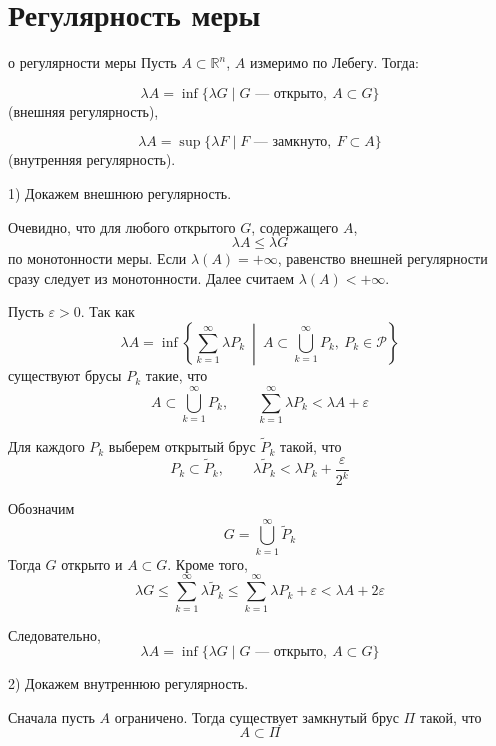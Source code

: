 \documentclass[12pt,a4paper]{article}
\begin{document}
\newpage

\section{Регулярность меры}

\begin{theorem}{о регулярности меры}
    Пусть $A \subset \mathbb{R}^n$, $A$ измеримо по Лебегу. Тогда:

    \[
        \lambda A = \inf\{\lambda G \mid G \text{ --- открыто},\ A \subset G\}
    \]
    (внешняя регулярность),

    \[
        \lambda A = \sup\{\lambda F \mid F \text{ --- замкнуто},\ F \subset A\}
    \]
    (внутренняя регулярность).
\end{theorem}

\begin{proofbox}{}
    1) Докажем внешнюю регулярность.

    Очевидно, что для любого открытого $G$, содержащего $A$,
    \[
        \lambda A \leq \lambda G
    \]
    по монотонности меры. Если $\lambda(A)=+\infty$, равенство внешней регулярности сразу следует из монотонности. Далее считаем $\lambda(A)<+\infty$.

    Пусть $\varepsilon>0$. Так как
    \[
        \lambda A
        =
        \inf\left\{
        \sum_{k=1}^{\infty}\lambda P_k
        \ \middle|\
        A\subset\bigcup_{k=1}^{\infty}P_k,\ P_k\in\mathcal{P}
        \right\}
    \]
    существуют брусы $P_k$ такие, что
    \[
        A\subset\bigcup_{k=1}^{\infty}P_k,
        \qquad
        \sum_{k=1}^{\infty}\lambda P_k<\lambda A+\varepsilon
    \]

    Для каждого $P_k$ выберем открытый брус $\widetilde P_k$ такой, что
    \[
        P_k\subset\widetilde P_k,
        \qquad
        \lambda\widetilde P_k<\lambda P_k+\frac{\varepsilon}{2^k}
    \]

    Обозначим
    \[
        G=\bigcup_{k=1}^{\infty}\widetilde P_k
    \]
    Тогда $G$ открыто и $A\subset G$. Кроме того,
    \[
        \lambda G
        \leq
        \sum_{k=1}^{\infty}\lambda\widetilde P_k
        \leq
        \sum_{k=1}^{\infty}\lambda P_k+\varepsilon
        <
        \lambda A+2\varepsilon
    \]

    Следовательно,
    \[
        \lambda A
        =
        \inf\{\lambda G\mid G\text{ --- открыто},\ A\subset G\}
    \]

    2) Докажем внутреннюю регулярность.

    Сначала пусть $A$ ограничено. Тогда существует замкнутый брус $\Pi$ такой, что
    \[
        A\subset\Pi
    \]


\end{proofbox}
\end{document}
